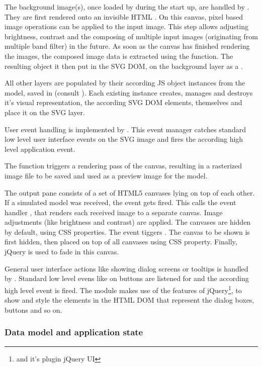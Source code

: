 The background image(s), once loaded by  during the start up, are handled by .
They are first rendered onto an invisible HTML .
On this canvas, pixel based image operations can be applied to the input image.
This step allows adjusting brightness, contrast and the composing of multiple input images (originating from multiple band filter) in the future.
As soon as the canvas has finished rendering the images, the composed image data is extracted using the  function.
The resulting object it then put in the SVG DOM, on the background layer as a .

All other layers are populated by their according JS object instances from the model, saved in  (consult ).
Each existing instance creates, manages and destroys it's visual representation, the according SVG DOM elements, themselves and place it on the SVG layer.

User event handling is implemented by .
This event manager catches standard low level user interface events on the SVG image and fires the according high level application event.

The function  triggers a rendering pass of the canvas, resulting in a rasterized image file to be saved and used as a preview image for the model.


The output pane  consists of a set of HTML5 canvases lying on top of each other.
If a simulated model was received, the event  gets fired.
This calls the event handler , that renders each received image to a separate canvas.
Image adjustments (like brightness and contrast) are applied.
The canvases are hidden by default, using CSS properties.
The event  tiggers .
The canvas to be shown is first hidden, then placed on top of all canvases using CSS  property.
Finally, jQuery is used to fade in this canvas.


General user interface actions like showing dialog screens or tooltips is handled by .
Standard low level evens like  on buttons are listened for and the according high level event is fired.
The module  makes use of the features of jQuery\footnote{and it's plugin jQuery UI}, to show and style the elements in the HTML DOM that represent the dialog boxes, buttons and so on.



\subsubsection{Data model and application state}
\label{sec:state}


